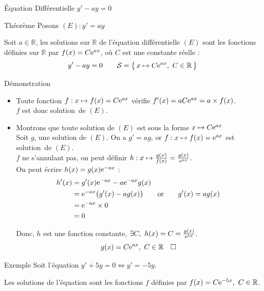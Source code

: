 \documentclass{coursbook}
\begin{document}
    \begin{Gpartie}{Équation Différentielle $y'-ay=0$} 
        \begin{Spartie}{Théorème} 
            Posons $(E) : y'=ay$

            Soit $a\in\mathbb{R}$, les solutions sur $\mathbb{R}$ de l'équation différentielle $(E)$ sont les fonctions définies sur $\mathbb{R}$ par $f(x)=C\mathrm{e}^{ax}$, où $C$ est une constante réelle :
            \[y'-ay=0\qquad\mathcal{S}=\big\{\,x\mapsto C\mathrm{e}^{ax},~C\in\mathbb{R}\,\big\}\]

            \begin{SSpartie}{Démonstration} 
                \begin{itemize}
                    \item Toute fonction $f:x\mapsto f(x)=C\mathrm{e}^{ax}$ vérifie $f'(x)=aC\mathrm{e}^{ax}=a\times f(x)$. \\ $f$ est donc solution~de $(E)$.
                    \item Montrons que toute solution de $(E)$ est sous la forme $x\mapsto C\mathrm{e}^{ax}$ \\
                    Soit $g$, une solution de $(E)$. On a $g'=ag$, or $f:x\mapsto f(x)=\mathrm{e}^{ax}$ est solution~de $(E)$. \\
                    $f$ ne s'annulant pas, on peut définir $h:x\mapsto \frac{g(x)}{f(x)}=\frac{g(x)}{\me^{ax}}$. \\
                    On peut écrire $h(x)=g(x)\mathrm{e}^{-ax}$ :
                    \[\begin{aligned}[t]
                        h'(x)&=g'(x)\mathrm{e}^{-ax}-a\mathrm{e}^{-ax}g(x) \\
                        &=\mathrm{e}^{-ax}\big(g'(x)-ag(x)\big)\qquad\text{or}\qquad g'(x)=ag(x) \\
                        &=\mathrm{e}^{-ax}\times 0 \\
                        &=0
                    \end{aligned}\]

                    Donc, $h$ est une fonction constante, $\exists C,~h(x)=C=\frac{g(x)}{\me^{ax}}$.
                    \[g(x)=C\mathrm{e}^{ax},~C\in\mathbb{R}\quad\square\]
                \end{itemize}
            \end{SSpartie}
            \begin{Spartie}{Exemple} 
                Soit l'équation $y'+5y=0\iff y'=-5y$.

                Les solutions de l'équation sont les fonctions $f$ définies par $f(x)=C\me^{-5x},\ C\in\mathbb{R}$.
            \end{Spartie}
        \end{Spartie}
    \end{Gpartie}
\end{document}
